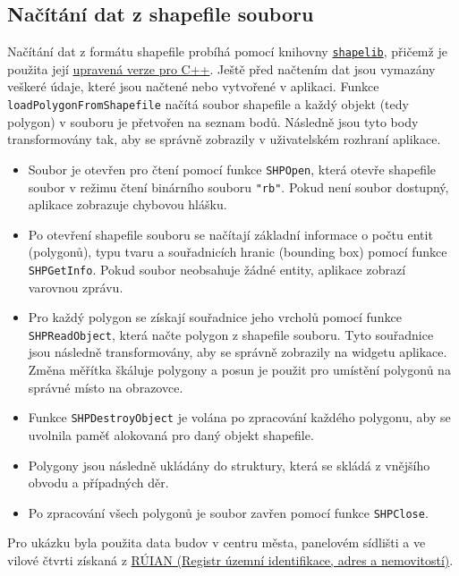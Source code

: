 \subsection{Načítání dat z shapefile souboru}
Načítání dat z formátu shapefile probíhá pomocí knihovny \texttt{\href{http://shapelib.maptools.org/}{shapelib}}, přičemž je použita její \href{https://github.com/zhihao-liu/shapefile-viewer-qt/tree/master/shapelib}{upravená verze pro C++}. Ještě před načtením dat jsou vymazány veškeré údaje, které jsou načtené nebo vytvořené v aplikaci. Funkce \texttt{loadPolygonFromShapefile} načítá soubor shapefile a každý objekt (tedy polygon) v souboru je přetvořen na seznam bodů. Následně jsou tyto body transformovány tak, aby se správně zobrazily v uživatelském rozhraní aplikace.

\begin{itemize}
    \item Soubor je otevřen pro čtení pomocí funkce \texttt{SHPOpen}, která otevře shapefile soubor v režimu čtení binárního souboru \texttt{"rb"}. Pokud není soubor dostupný, aplikace zobrazuje chybovou hlášku.
    \item Po otevření shapefile souboru se načítají základní informace o počtu entit (polygonů), typu tvaru a souřadnicích hranic (bounding box) pomocí funkce \texttt{SHPGetInfo}. Pokud soubor neobsahuje žádné entity, aplikace zobrazí varovnou zprávu.
    \item Pro každý polygon se získají souřadnice jeho vrcholů pomocí funkce \texttt{SHPReadObject}, která načte polygon z shapefile souboru. Tyto souřadnice jsou následně transformovány, aby se správně zobrazily na widgetu aplikace. Změna měřítka škáluje polygony a posun je použit pro umístění polygonů na správné místo na obrazovce.
    \item Funkce \texttt{SHPDestroyObject} je volána po zpracování každého polygonu, aby se uvolnila paměť alokovaná pro daný objekt shapefile.
    \item Polygony jsou následně ukládány do struktury, která se skládá z vnějšího obvodu a případných děr.
    \item Po zpracování všech polygonů je soubor zavřen pomocí funkce \texttt{SHPClose}.
\end{itemize}

Pro ukázku byla použita data budov v centru města, panelovém sídlišti a ve vilové čtvrti získaná z \href{https://ags.cuzk.gov.cz/arcgis/rest/services/RUIAN/MapServer}{RÚIAN (Registr územní identifikace, adres a nemovitostí)}\cite{ags_cuzk}.
